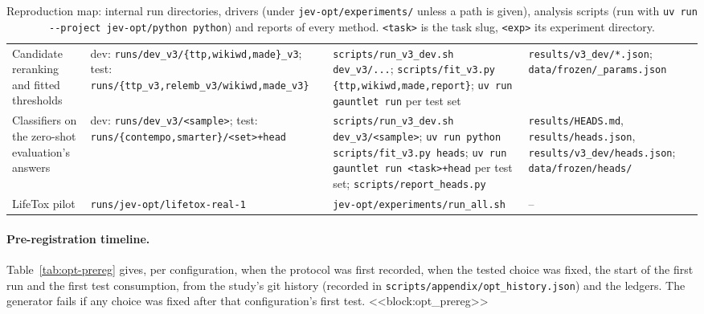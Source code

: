 \begin{table}[p]
\begin{tabular}{p{3.3cm}p{3.9cm}p{5.2cm}p{3.6cm}}
Candidate reranking and fitted thresholds & dev: \texttt{runs/\allowbreak dev\_v3/\allowbreak \{ttp,wikiwd,made\}\_v3}; test: \texttt{runs/\allowbreak \{ttp\_v3,\allowbreak relemb\_v3/\allowbreak wikiwd,\allowbreak made\_v3\}} & \texttt{scripts/\allowbreak run\_v3\_dev.sh dev\_v3/...}; \texttt{scripts/\allowbreak fit\_v3.py \{ttp,wikiwd,made,report\}}; \texttt{uv run gauntlet run} per test set & \texttt{results/\allowbreak v3\_dev/*.json}; \texttt{data/\allowbreak frozen/\allowbreak *\_params.json} \\
Classifiers on the zero-shot evaluation's answers & dev: \texttt{runs/\allowbreak dev\_v3/\allowbreak <sample>}; test: \texttt{runs/\allowbreak \{contempo,smarter\}/\allowbreak <set>+head} & \texttt{scripts/\allowbreak run\_v3\_dev.sh dev\_v3/<sample>}; \texttt{uv run python scripts/\allowbreak fit\_v3.py heads}; \texttt{uv run gauntlet run <task>+head} per test set; \texttt{scripts/\allowbreak report\_heads.py} & \texttt{results/\allowbreak HEADS.md}, \texttt{results/\allowbreak heads.json}, \texttt{results/\allowbreak v3\_dev/\allowbreak heads.json}; \texttt{data/\allowbreak frozen/\allowbreak heads/} \\
LifeTox pilot & \texttt{runs/\allowbreak jev-opt/\allowbreak lifetox-real-1} & \texttt{jev-opt/\allowbreak experiments/\allowbreak run\_all.sh} & -- \\
\bottomrule
\end{tabular}
\caption{Reproduction map: internal run directories, drivers (under \texttt{jev-opt/\allowbreak experiments/} unless a path is given), analysis scripts (run with \texttt{uv run -{}-project jev-opt/\allowbreak python python}) and reports of every method. \texttt{<task>} is the task slug, \texttt{<exp>} its experiment directory.}
\label{tab:opt-repro}
\end{table}

\paragraph{Pre-registration timeline.}
Table~\ref{tab:opt-prereg} gives, per configuration, when the protocol was first recorded, when the tested choice was fixed, the start of the first run and the first test consumption, from the study's git history (recorded in \texttt{scripts/\allowbreak appendix/\allowbreak opt\_history.json}) and the ledgers. The generator fails if any choice was fixed after that configuration's first test.
<<block:opt_prereg>>

